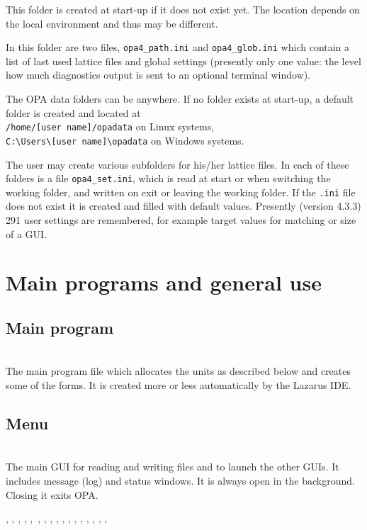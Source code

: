 \documentclass[12pt]{article}
\newcommand\code[1]{{\tt #1}}
\newcommand{\opagui}[1]{\colorbox{blue!20}{{\color{black}\code{#1}}}}
\newcommand{\oguih}[2]{\subsection{\label{#2}#1}{\Huge\opagui{#2}}\\}
\newcommand{\ogui}[1]{\hyperref[#1]{\opagui{#1}}}
\newcommand{\opauni}[1]{\colorbox{orange!30}{{\color{black}\code{#1}}}}
\newcommand{\ounih}[2]{\subsection{\label{#2}#1}{\Huge\opauni{#2}}\\}
\newcommand{\ouni}[1]{\hyperref[#1]{\opauni{#1}}}
\newcommand{\uses}[1]{\flushleft {\bf Uses:} #1}
\newcommand{\desc}[1]{#1}
\begin{document}
This folder is created at start-up if it does not exist yet. The location depends on the local environment and thus may be different.

In this folder are two files, \code{opa4\_path.ini} and \code{opa4\_glob.ini} which contain a list of last used lattice files and global settings (presently only one value: the level how much diagnostics output is sent to an optional terminal window). 

The OPA data folders can be anywhere. If no folder exists at start-up, a default folder is created and located at \\
\code{/home/[user~name]/opadata} on Linux systems,  \\
\code{C:\textbackslash Users\textbackslash [user~name]\textbackslash opadata} on Windows systems.

The user may create various subfolders for his/her lattice files.
In each of these folders is a file \code{opa4\_set.ini}, which is read at start or when switching the working folder, and written on exit or leaving the working folder. If the \code{.ini} file does not exist it is created and filled with default values. Presently (version 4.3.3) 291 user settings are remembered, for example target values for matching or size of a GUI. 



\section{\label{secglob}Main programs and general use}

\ounih{Main program}{{opa.lpr}}

\desc{The main program file which allocates the units as described below and creates some of the forms. It is created more or less automatically by the Lazarus IDE.}


\oguih{Menu}{opamenu}

\desc{The main GUI for reading and writing files and to launch the other GUIs. It includes message (log) and status windows. It is always open in the background. Closing it exits OPA.}

\uses{\ouni{globlib}, \ogui{opaeditor}, \ogui{opatexteditor}, \ouni{editorlib}, \ouni{latfilelib},\ \ogui{opalinop}, \ogui{opatunediag}, 
  \ogui{opamomentum}, \ogui{opachroma}, \ogui{opatrackps},  \ogui{opatrackda}, \ogui{opatracktt}, \ogui{opaorbit},
  \ogui{opageometry}, \ogui{opalgbedit}, \ogui{opabucket}, \ogui{opacurrents}, \ouni{testcode}}
 
\end{document}
